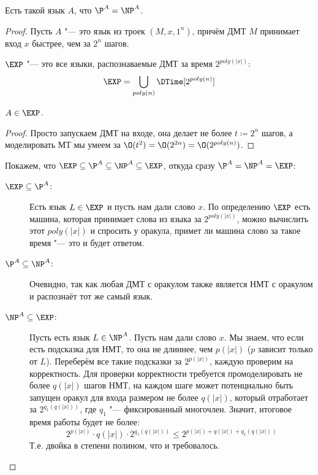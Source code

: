 	\begin{theorem}
		Есть такой язык $A$, что $\P^A = \NP^A$.
	\end{theorem}
	\begin{proof}
		Пусть $A$ "--- это язык из троек $(M, x, 1^n)$, причём ДМТ $M$ принимает вход $x$ быстрее, чем за $2^n$ шагов.
		\begin{Def}
			$\EXP$ "--- это все языки, распознаваемые ДМТ за время $2^{poly(|x|)}$:
			\[ \EXP = \bigcup_{poly(n)} \DTime[2^{poly(n)}] \]
		\end{Def}
		\begin{assertion}
			$A \in \EXP$.
		\end{assertion}
		\begin{proof}
			Просто запускаем ДМТ на входе, она делает не более $t\coloneq 2^n$ шагов, а моделировать МТ мы умеем
			за $\O(t^2)=\O(2^{2n})=\O(2^{poly(n)})$.
		\end{proof}
		Покажем, что $\EXP \subseteq \P^A \subseteq \NP^A \subseteq \EXP$, откуда сразу $\P^A=\NP^A=\EXP$:
		\begin{description}
			\item[$\EXP\subseteq \P^A$:]
				Есть язык $L \in \EXP$ и пусть нам дали слово $x$.
				По определению $\EXP$ есть машина, которая принимает слова из языка за $2^{poly(|x|)}$, можно вычислить этот $poly(|x|)$
				и спросить у оракула, примет ли машина слово за такое время "--- это и будет ответом.
			\item[$\P^A\subseteq \NP^A$:]
				Очевидно, так как любая ДМТ с оракулом также является НМТ с оракулом и распознаёт тот же самый язык.
			\item[$\NP^A\subseteq \EXP$:]
				Пусть есть язык $L \in \NP^A$.
				Пусть нам дали слово $x$.
				Мы знаем, что если есть подсказка для НМТ, то она не длиннее, чем $p(|x|)$ ($p$ зависит только от $L$).
				Переберём все такие подсказки за $2^{p(|x|)}$, каждую проверим на корректность.
				Для проверки корректности требуется промоделировать не более $q(|x|)$ шагов НМТ, на каждом шаге может потенциально
				быть запущен оракул для входа размером не более $q(|x|)$, который отработает за $2^{q_1(q(|x|))}$, где $q_1$ "--- фиксированный многочлен.
				Значит, итоговое время работы будет не более:
				\[
					2^{p(|x|)} \cdot q(|x|) \cdot 2^{q_1(q(|x|))} \le
					2^{p(|x|)+q(|x|)+q_1(q(|x|))}
				\]
				Т.е. двойка в степени полином, что и требовалось.
		\end{description}
	\end{proof}

